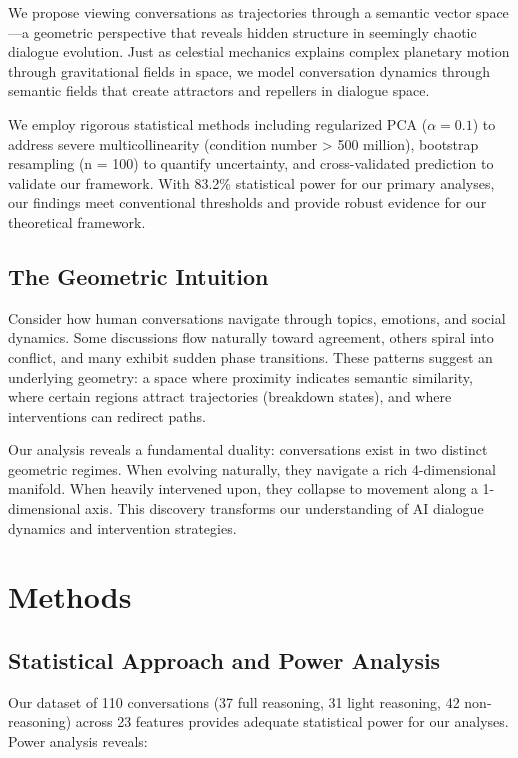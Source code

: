 \documentclass[11pt,letterpaper]{article}
\newcommand{\totalConversations}{110}
\newcommand{\fullReasoningCount}{37}
\newcommand{\lightReasoningCount}{31}
\newcommand{\nonReasoningCount}{42}
\newcommand{\featureCount}{23}
\newcommand{\powerOutcomeGroups}{83.2\%}
\newcommand{\regularizationAlpha}{0.1}
\newcommand{\bootstrapSamples}{100}
\begin{document}
We propose viewing conversations as trajectories through a semantic vector space—a geometric perspective that reveals hidden structure in seemingly chaotic dialogue evolution. Just as celestial mechanics explains complex planetary motion through gravitational fields in space, we model conversation dynamics through semantic fields that create attractors and repellers in dialogue space.

We employ rigorous statistical methods including regularized PCA ($\alpha = \regularizationAlpha{}$) to address severe multicollinearity (condition number > 500 million), bootstrap resampling (n = \bootstrapSamples{}) to quantify uncertainty, and cross-validated prediction to validate our framework. With \powerOutcomeGroups{} statistical power for our primary analyses, our findings meet conventional thresholds and provide robust evidence for our theoretical framework.

\subsection{The Geometric Intuition}

Consider how human conversations navigate through topics, emotions, and social dynamics. Some discussions flow naturally toward agreement, others spiral into conflict, and many exhibit sudden phase transitions. These patterns suggest an underlying geometry: a space where proximity indicates semantic similarity, where certain regions attract trajectories (breakdown states), and where interventions can redirect paths.

Our analysis reveals a fundamental duality: conversations exist in two distinct geometric regimes. When evolving naturally, they navigate a rich 4-dimensional manifold. When heavily intervened upon, they collapse to movement along a 1-dimensional axis. This discovery transforms our understanding of AI dialogue dynamics and intervention strategies.

\section{Methods}

\subsection{Statistical Approach and Power Analysis}

Our dataset of \totalConversations{} conversations (\fullReasoningCount{} full reasoning, \lightReasoningCount{} light reasoning, \nonReasoningCount{} non-reasoning) across \featureCount{} features provides adequate statistical power for our analyses. Power analysis reveals:
\end{document}
